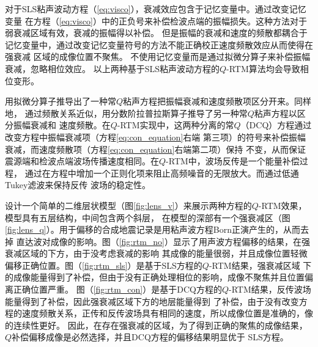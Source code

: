 对于SLS粘声波动方程（\ref{eq:visco}），衰减效应包含于记忆变量中。通过改变记忆变量
在方程（\ref{eq:visco}）中的正负号来补偿检波点端的振幅损失。这种方法对于弱衰减区域有效，衰减的振幅得以补偿。
但是振幅的衰减和速度的频散都耦合于记忆变量中，通过改变记忆变量符号的方法不能正确校正速度频散效应从而使得在强衰减
区域的成像位置不聚焦。 不使用记忆变量而是通过拟微分算子来补偿振幅衰减，忽略相位效应。
以上两种基于SLS粘声波动方程的$Q$-RTM算法均会导致相位变形。

 用拟微分算子推导出了一种常$Q$粘声方程把振幅衰减和速度频散项区分开来。同样地，
通过频散关系近似，用分数阶拉普拉斯算子推导了另一种常$Q$粘声方程以区分振幅衰减和
速度频散。在$Q$-RTM实现中，这两种分离的常$Q$（DCQ）方程通过改变方程中振幅衰减项（方程\ref{eq:con_equation}右端
第三项）的符号来补偿振幅衰减，而速度频散项（方程\ref{eq:con_equation}右端第二项）保持
不变，从而保证震源端和检波点端波场传播速度相同。在$Q$-RTM中，波场反传是一个能量补偿过程，
通过在方程中增加一个正则化项来阻止高频噪音的无限放大。而通过低通Tukey滤波来保持反传
波场的稳定性。

设计一个简单的二维层状模型（图\ref{fig:lens_v}）来展示两种方程的$Q$-RTM效果，模型具有五层结构，中间包含两个斜层，
在模型的深部有一个强衰减区（图\ref{fig:lens_q}）。用于偏移的合成地震记录是用粘声波方程Born正演产生的，从而去掉
直达波对成像的影响。图（\ref{fig:rtm_no}）显示了用声波方程偏移的结果，在强衰减区域的下方，由于没考虑衰减的影响
其成像的能量很弱，并且成像位置轻微偏移正确位置。图（\ref{fig:rtm_sls}）是基于SLS方程的$Q$-RTM结果，强衰减区域
下的成像能量得到了补偿，但由于没有正确处理相位的影响，成像不聚焦并且位置偏离正确位置严重。
图（\ref{fig:rtm_con}）是基于DCQ方程的$Q$-RTM结果，反传波场能量得到了补偿，因此强衰减区域下方的地层能量得到
了补偿，由于没有改变方程的速度频散关系，正传和反传波场具有相同的速度，所以成像位置是准确的，像的连续性更好。
因此，在存在强衰减的区域，为了得到正确的聚焦的成像结果，$Q$补偿偏移成像是必然选择，并且DCQ方程的偏移结果明显优于
SLS方程。

